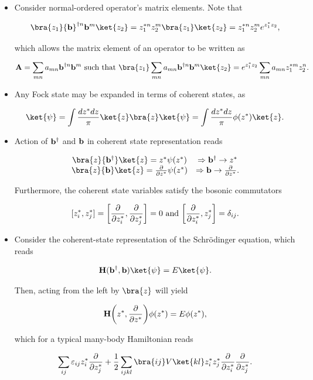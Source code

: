 \begin{itemize}
    \item Consider normal-ordered operator's matrix elements. Note that 
    
    $$
        \bra{z_1} {{\bf b}}^{\dagger n}       {{\bf b}}^{m} \ket{z_2} = z_1^{*n} z_2^m \bra{z_1}\ket{z_2} = z_1^{*n} z_2^{m} e^{z_1^* z_2},
    $$
    
    which allows the matrix element of an operator to be written as 
    
    $$
        {\bf A} = \sum_{mn} a_{mn} {{\bf b}}^{\dagger n} {{\bf b}}^{m} \textnormal{ such that } \bra{z_1} \sum_{mn} a_{mn} {{\bf b}}^{\dagger n} {{\bf b}}^{m} \ket{z_2} = e^{z_1^* z_2} \sum_{mn} a_{mn} z_1^{*m} z_2^n.
    $$
    
    \item Any Fock state may be expanded in terms of coherent states, as 
    
    $$
        \ket{\psi} = \int \frac{dz^* dz}{\pi} \ket{z} \bra{z} \ket{\psi} = \int \frac{dz^* dz}{\pi} \phi(z^*) \ket{z}.
    $$
    
    \item Action of ${{\bf b}}^{\dagger}$ and ${\bf b}$ in coherent state representation reads 
    
    $$
    \begin{array}{cc}
        \bra{z} {{\bf b}^\dagger} \ket{z} = z^* \psi(z^*) & \Rightarrow {{\bf b}^\dagger} \rightarrow z^*  \\
        \bra{z} {{\bf b}} \ket{z} = \frac{\partial}{\partial z^*} \psi(z^*) & \Rightarrow {\bf {{\bf b}}} \rightarrow \frac{\partial}{\partial z^*}. 
    \end{array}
    $$
    
    Furthermore, the coherent state variables satisfy the bosonic commutators 
    
    $$
    [z_i^*, z_j^*] = \bigg[\frac{\partial}{\partial z_i^*}, \frac{\partial}{\partial z_j^*}\bigg] = 0 \textnormal{ and } \bigg[\frac{\partial}{\partial z_i^*}, z_j^*\bigg] = \delta_{ij}.
    $$
    
    \item Consider the coherent-state representation of the Schr\"odinger equation, which reads 
    
    $$
        {{\bf H}}({{\bf b}^\dagger},  {{\bf b}}) \ket{\psi} = E \ket{\psi}.
    $$
    
    Then, acting from the left by $\bra{z}$ will yield 
    
    $$
        {{\bf H}}\bigg(z^*,\frac{\partial}{\partial z^*} \bigg) \phi(z^*) = E \phi(z^*),
    $$
    
    which for a typical many-body Hamiltonian reads
    
    $$
        \sum_{ij} \varepsilon_{ij} z_i^* \frac{\partial}{\partial z_j^*} + \frac{1}{2} \sum_{ijkl} \bra{ij} V \ket{kl} z_i^* z_j^* \frac{\partial}{\partial z_i^*} \frac{\partial}{\partial z_j^*}.
    $$
\end{itemize}

